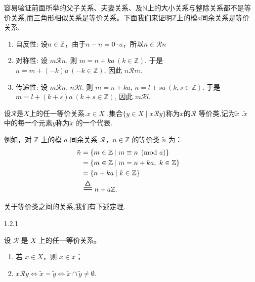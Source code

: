 容易验证前面所举的父子关系、夫妻关系、及$\mathbb{N}$上的大小关系与整除关系都不是等价关系,而三角形相似关系是等价关系。下面我们来证明$\mathbb{Z}$上的模$a$同余关系是等价关系.

\begin{enumerate}[label=\arabic*)]
	\item 自反性: 设$n\in\mathbb{Z}$，由于$n-n=0\cdot a$，所以$n\in\mathscr{R}n$
	\item 对称性: 设 \(m\mathscr{R}n\). 则 \(m=n+ka\ (k\in \mathbb{Z})\). 于是 \(n=m+(-k)a\ (-k\in \mathbb{Z})\), 因此 \(n\mathscr{R}m\).
	\item 传递性: 设 \(m\mathscr{R}n\), \(n\mathscr{R}l\). 则 \(m=n+ka\), \(n=l+sa\ (k, s\in \mathbb{Z})\). 于是 \(m=l+(k+s)a\ (k+s\in \mathbb{Z})\), 因此 \(m\mathscr{R}l\).
\end{enumerate}

\begin{mydef*}{}

设$\mathscr{R}$是$X$上的任一等价关系.\(x \in X\) .集合\(\{y \in X \mid x \mathscr{R} y\}\)称为$x$的\(\mathscr{R}\) 等价类,记为\(\tilde{x}\) .\(\tilde{x}\) 中的每一个元素$y$称为\(\tilde{x}\) 的一个代表.

\end{mydef*}

例如，对 \(\mathbb{Z}\) 上的模 \(a\) 同余关系 \(\mathscr{R}\)，\(n \in \mathbb{Z}\) 的等价类 \(\tilde{n}\) 为：
\begin{align*}
	\tilde{n} &= \{ m \in \mathbb{Z} \mid m \equiv n \pmod{a} \} \\
	&= \{ m \in \mathbb{Z} \mid m = n + ka,\ k \in \mathbb{Z} \} \\
	&= \{ n + ka \mid k \in \mathbb{Z} \} \\
	&\mathrel{\scalebox{1.8}{$\triangleq$}} n + a\mathbb{Z}.
\end{align*}

关于等价类之间的关系,我们有下述定理. 

\begin{mythm*}{1.2.1}
	
设 \(\mathscr{R}\) 是 \(X\) 上的任一等价关系。
\begin{enumerate}[label=\arabic*)]
	\item 若 \(x \in X\)，则 \(x \in \tilde{x}\)；
	\item \(x \mathscr{R} y \iff \tilde{x} = \tilde{y} \iff \tilde{x} \cap \tilde{y} \neq \emptyset\).
\end{enumerate}

\end{mythm*}

